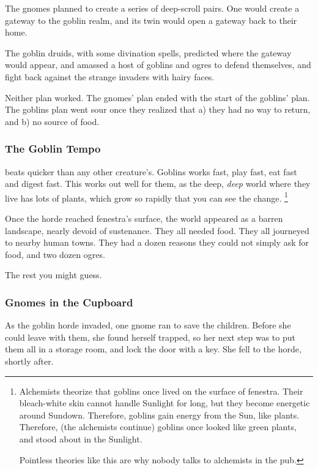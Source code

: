 \begin{multicols}{2}
\begin{exampletext}
  The gnomes planned to create a series of \gls{deep}-scroll pairs.
  One would create a gateway to the goblin realm, and its twin would open a gateway back to their home.

  The goblin druids, with some divination spells, predicted where the gateway would appear, and amassed a host of goblins and \glspl{ogre} to defend themselves, and fight back against the strange invaders with hairy faces. 

  Neither plan worked.
  The gnomes' plan ended with the start of the goblins' plan.
  The goblins plan went sour once they realized that a) they had no way to return, and b) no source of food.

  \subsubsection{The Goblin Tempo}
  beats quicker than any other creature's.
  Goblins works fast, play fast, eat fast and digest fast.
  This works out well for them, as the deep, \emph{deep} world where they live has lots of plants, which grow so rapidly that you can see the change.%
  \footnote{Alchemists theorize that goblins once lived on the surface of \gls{fenestra}.
  Their bleach-white skin cannot handle Sunlight for long, but they become energetic around Sundown.
  Therefore, goblins gain energy from the Sun, like plants.
  Therefore, (the alchemists continue) goblins once looked like green plants, and stood about in the Sunlight.

  Pointless theories like this are why nobody talks to alchemists in the pub.}

  Once the horde reached \gls{fenestra}'s surface, the world appeared as a barren landscape, nearly devoid of sustenance.
  They all needed food.
  They all journeyed to nearby human towns.
  They had a dozen reasons they could not simply ask for food, and two dozen \glspl{ogre}.

  The rest you might guess.

\end{exampletext}


\subsubsection{Gnomes in the Cupboard}
\label{saving_the_children}

\begin{exampletext}
  As the goblin horde invaded, one gnome ran to save the children.
  Before she could leave with them, she found herself trapped, so her next step was to put them all in a storage room, and lock the door with a key.
  She fell to the horde, shortly after.


\end{exampletext}
\end{multicols}
